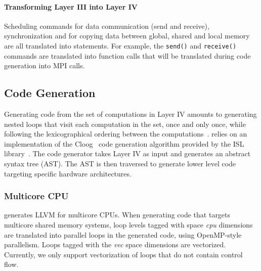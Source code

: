 \vspace{-0.25cm}
\paragraph{Transforming Layer III into Layer IV}
Scheduling commands for data communication (send and receive), synchronization and for copying data between global, shared and local memory are all translated into statements.  For example, the \texttt{send()} and \texttt{receive()} commands are translated into function calls that will be translated during code generation into MPI calls.

\vspace{-0.25cm}
\subsection{Code Generation}

Generating code from the set of computations in Layer IV amounts to generating nested loops that visit each computation in the set, once and only once, while following the lexicographical ordering between the computations~\cite{Bas04,Iri88,Qui00}. \framework{} relies on an implementation of the Cloog~\cite{Bas04} code generation algorithm provided by the ISL library~\cite{verdoolaege_isl:_2010}. 
The \framework{} code generator takes Layer IV as input and generates an abstract syntax tree (AST).  The AST is then traversed to generate lower level code targeting specific hardware architectures.

\vspace{-0.25cm}
\subsubsection{Multicore CPU}

\framework{} generates LLVM for multicore CPUs.  When generating code that targets multicore shared memory systems, loop levels tagged with space \emph{cpu} dimensions are translated into parallel loops in the generated code, using OpenMP-style parallelism.  Loops tagged with the \emph{vec} space dimensions are vectorized.  Currently, we only support vectorization of loops that do not contain control flow.

\vspace{-0.25cm}
